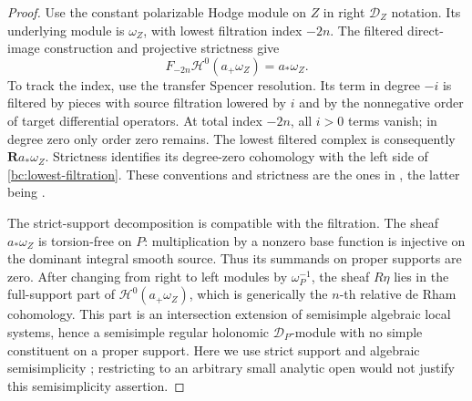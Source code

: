 \begin{proof}
Use the constant polarizable Hodge module on $Z$ in right
$\mathcal D_Z$ notation.  Its underlying module is $\omega_Z$, with
lowest filtration index $-2n$.  The filtered direct-image construction
and projective strictness give
\begin{equation}\label{bc:lowest-filtration}
 F_{-2n}\mathcal H^0(a_+\omega_Z)=a_*\omega_Z.
\end{equation}
To track the index, use the transfer Spencer resolution.  Its term in
degree $-i$ is filtered by pieces with source filtration lowered by
$i$ and by the nonnegative order of target differential operators.
At total index $-2n$, all $i>0$ terms vanish; in degree zero only
order zero remains.  The lowest filtered complex is consequently
$\mathbf Ra_*\omega_Z$.  Strictness identifies its degree-zero
cohomology with the left side of \eqref{bc:lowest-filtration}.
These conventions and strictness are the ones in
\cite[Sections~B.2--B.3 and Theorem~1.4]{Saito2016}, the latter being
\cite[Theorem~5.3.1]{Saito1988}.

The strict-support decomposition is compatible with the filtration.
The sheaf $a_*\omega_Z$ is torsion-free on $P$: multiplication by a
nonzero base function is injective on the dominant integral smooth
source.  Thus its summands on proper supports are zero.  After changing
from right to left modules by $\omega_P^{-1}$, the sheaf $R\eta$ lies
in the full-support part of $\mathcal H^0(a_+\omega_Z)$, which is
generically the $n$-th relative de Rham cohomology.  This part is an
intersection extension of semisimple algebraic local systems, hence a
semisimple regular holonomic $\mathcal D_P$-module with no simple
constituent on a proper support.  Here we use strict support
\cite[Section~1.2]{Saito2016} and algebraic semisimplicity
\cite[Proposition~4.2.5 and Theorem~4.2.6]{Deligne1971}; restricting to an arbitrary small
analytic open would not justify this semisimplicity assertion.


\end{proof}
